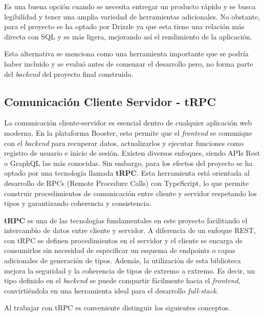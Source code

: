 Es una buena opción cuando se necesita entregar un producto rápido y se busca legibilidad y tener una amplia variedad de herramientas adicionales. No obstante, para el proyecto se ha optado por Drizzle ya que esta tiene una relación más directa con SQL y es más ligera, mejorando así el rendimiento de la aplicación. 

Esta alternativa se menciona como una herramienta importante que se podría haber incluido y se evaluó antes de comenzar el desarrollo pero, no forma parte del \textit{backend} del proyecto final construido. 

\subsection{Comunicación Cliente Servidor - tRPC}

\label{trpc}

La comunicación cliente-servidor es esencial dentro de cualquier aplicación web moderna. En la plataforma Booster, esto permite que el \textit{frontend} se comunique con el \textit{backend} para recuperar datos, actualizarlos y ejecutar funciones como registro de usuario e inicio de sesión. Existen diversos enfoques, siendo APIs Rest o GraphQL las más conocidas. Sin embargo, para los efectos del proyecto se ha optado por una tecnología llamada \textbf{tRPC}. Esta herramienta está orientada al desarrollo de RPCs (Remote Procedure Calls) con TypeScript, lo que permite construir procedimientos de comunicación entre cliente y servidor respetando los tipos y garantizando coherencia y consistencia.

\textbf{tRPC} es una de las tecnologías fundamentales en este proyecto facilitando el intercambio de datos entre cliente y servidor. A diferencia de un enfoque REST, con tRPC se definen procedimientos en el servidor y el cliente se encarga de consumirlos sin necesidad de especificar un esquema de endpoints o capas adicionales de generación de tipos. Además, la utilización de esta biblioteca mejora la seguridad y la coherencia de tipos de extremo a extremo. Es decir, un tipo definido en el \textit{backend} se puede compartir fácilmente hacia el \textit{frontend}, convirtiéndola en una herramienta ideal para el desarrollo \textit{full-stack}.

Al trabajar con tRPC es conveniente distinguir los siguientes conceptos. \cite{trpc-concepts}

